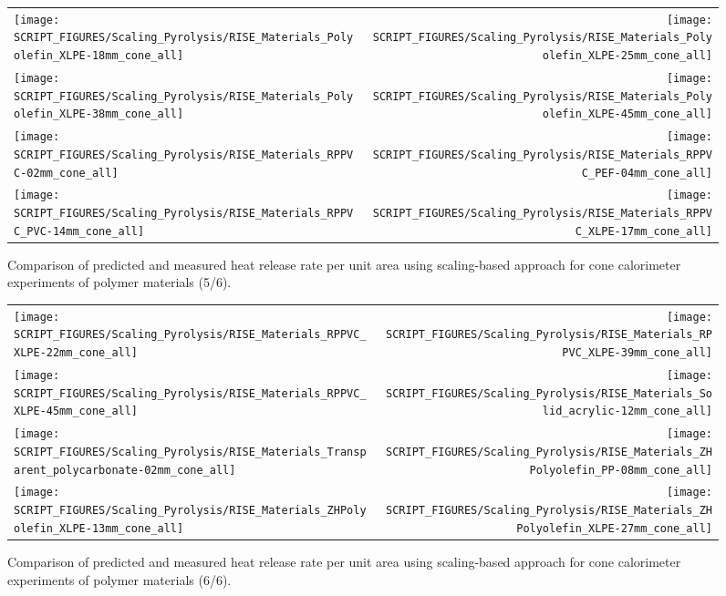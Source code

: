 \begin{figure}[!h]
\begin{tabular*}{\textwidth}{l@{\extracolsep{\fill}}r}
\texttt{[image: SCRIPT\_FIGURES/Scaling\_Pyrolysis/RISE\_Materials\_Polyolefin\_XLPE-18mm\_cone\_all]} &
\texttt{[image: SCRIPT\_FIGURES/Scaling\_Pyrolysis/RISE\_Materials\_Polyolefin\_XLPE-25mm\_cone\_all]} \\
\texttt{[image: SCRIPT\_FIGURES/Scaling\_Pyrolysis/RISE\_Materials\_Polyolefin\_XLPE-38mm\_cone\_all]} &
\texttt{[image: SCRIPT\_FIGURES/Scaling\_Pyrolysis/RISE\_Materials\_Polyolefin\_XLPE-45mm\_cone\_all]} \\
\texttt{[image: SCRIPT\_FIGURES/Scaling\_Pyrolysis/RISE\_Materials\_RPPVC-02mm\_cone\_all]} &
\texttt{[image: SCRIPT\_FIGURES/Scaling\_Pyrolysis/RISE\_Materials\_RPPVC\_PEF-04mm\_cone\_all]} \\
\texttt{[image: SCRIPT\_FIGURES/Scaling\_Pyrolysis/RISE\_Materials\_RPPVC\_PVC-14mm\_cone\_all]} &
\texttt{[image: SCRIPT\_FIGURES/Scaling\_Pyrolysis/RISE\_Materials\_RPPVC\_XLPE-17mm\_cone\_all]} \\
\end{tabular*}
\caption[HRRPUA of RISE materials using scaling model, polymer materials]
{Comparison of predicted and measured heat release rate per unit area using scaling-based approach for cone calorimeter experiments of polymer materials (5/6).}
\label{RISE_Materials_polymers5}
\end{figure}

\begin{figure}[!h]
\begin{tabular*}{\textwidth}{l@{\extracolsep{\fill}}r}
\texttt{[image: SCRIPT\_FIGURES/Scaling\_Pyrolysis/RISE\_Materials\_RPPVC\_XLPE-22mm\_cone\_all]} &
\texttt{[image: SCRIPT\_FIGURES/Scaling\_Pyrolysis/RISE\_Materials\_RPPVC\_XLPE-39mm\_cone\_all]} \\
\texttt{[image: SCRIPT\_FIGURES/Scaling\_Pyrolysis/RISE\_Materials\_RPPVC\_XLPE-45mm\_cone\_all]} &
\texttt{[image: SCRIPT\_FIGURES/Scaling\_Pyrolysis/RISE\_Materials\_Solid\_acrylic-12mm\_cone\_all]} \\
\texttt{[image: SCRIPT\_FIGURES/Scaling\_Pyrolysis/RISE\_Materials\_Transparent\_polycarbonate-02mm\_cone\_all]} &
\texttt{[image: SCRIPT\_FIGURES/Scaling\_Pyrolysis/RISE\_Materials\_ZHPolyolefin\_PP-08mm\_cone\_all]} \\
\texttt{[image: SCRIPT\_FIGURES/Scaling\_Pyrolysis/RISE\_Materials\_ZHPolyolefin\_XLPE-13mm\_cone\_all]} &
\texttt{[image: SCRIPT\_FIGURES/Scaling\_Pyrolysis/RISE\_Materials\_ZHPolyolefin\_XLPE-27mm\_cone\_all]} \\
\end{tabular*}
\caption[HRRPUA of RISE materials using scaling model, polymer materials]
{Comparison of predicted and measured heat release rate per unit area using scaling-based approach for cone calorimeter experiments of polymer materials (6/6).}
\label{RISE_Materials_polymers6}
\end{figure}

